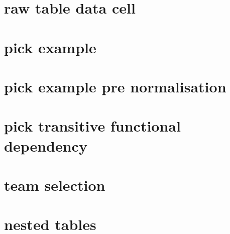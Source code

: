 \documentclass[10pt,a4paper]{article}
\begin{document}
\section{raw table data cell}



\section{pick example}


\section{pick example pre normalisation}


\section{pick transitive functional dependency}


\section{team selection}


\iffalse
\needspace{20\baselineskip}
\section{nested rows}

\fi

\section{nested tables}

\end{document}
